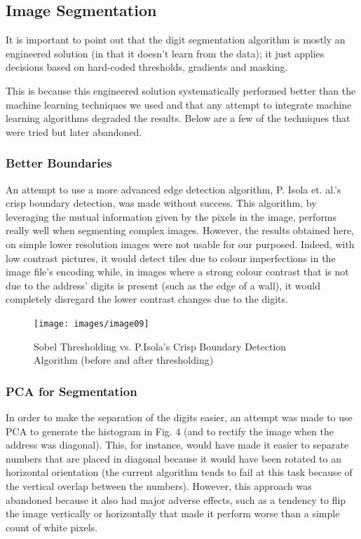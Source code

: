 \documentclass{article} %
\begin{document}
\subsection{Image Segmentation}

It is important to point out that the digit segmentation algorithm is mostly an engineered solution (in that it doesn’t learn from the data); it just applies decisions based on hard-coded thresholds, gradients and masking.

This is because this engineered solution systematically performed better than the machine learning techniques we used and that any attempt to integrate machine learning algorithms degraded the results. Below are a few of the techniques that were tried but later abandoned.

\subsubsection{Better Boundaries}
An attempt to use a more advanced edge detection algorithm, P. Isola et. al.’s crisp boundary detection\cite{isola2014crisp}, was made without success. This algorithm, by leveraging the mutual information given by the pixels in the image, performs really well when segmenting complex images. However, the results obtained here, on simple lower resolution images were not usable for our purposed. Indeed, with low contrast pictures, it would detect tiles due to colour imperfections in the image file’s encoding while, in images where a strong colour contrast that is not due to the address’ digits is present (such as the edge of a wall), it would completely disregard the lower contrast changes due to the digits.

\begin{center}
\begin{figure}[!htb]
  \texttt{[image: images/image09]}
  \caption{Sobel Thresholding vs. P.Isola's Crisp Boundary Detection Algorithm (before and after thresholding)}
  \label{fig:isola}
\end{figure}
\end{center}

\subsubsection{PCA for Segmentation}
In order to make the separation of the digits easier, an attempt was made to use PCA to generate the histogram in Fig. 4 (and to rectify the image when the address was diagonal). This, for instance, would have made it easier to separate numbers that are placed in diagonal because it would have been rotated to an horizontal orientation (the current algorithm tends to fail at this task because of the vertical overlap between the numbers). However, this approach was abandoned because it also had major adverse effects, such as a tendency to flip the image vertically or horizontally that made it perform worse than a simple count of white pixels.
\end{document}
